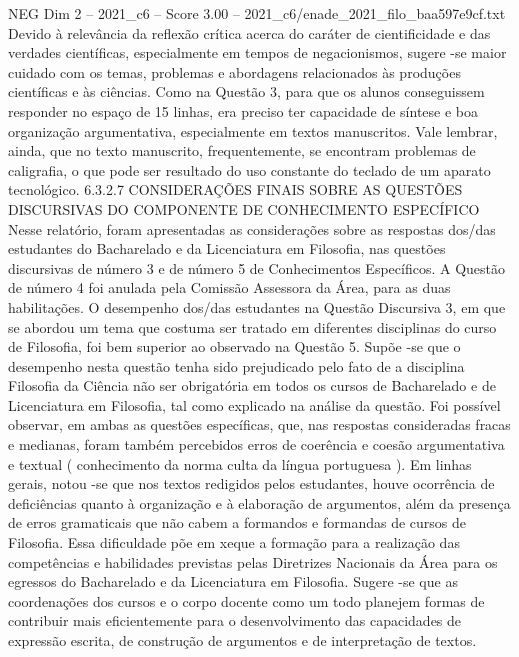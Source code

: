 \begin{textsample}{NEG Dim 2 – 2021\_c6 – Score 3.00 – 2021\_c6/enade\_2021\_filo\_baa597e9cf.txt}
Devido à relevância da reflexão crítica acerca do caráter de cientificidade e das verdades científicas, especialmente em tempos de negacionismos, sugere -se maior cuidado com os temas, problemas e abordagens relacionados às produções científicas e às ciências.
Como na Questão 3, para que os alunos conseguissem responder no espaço de 15 linhas, era preciso ter capacidade de síntese e boa organização argumentativa, especialmente em textos manuscritos.
Vale lembrar, ainda, que no texto manuscrito, frequentemente, se encontram problemas de caligrafia, o que pode ser resultado do uso constante do teclado de um aparato tecnológico. 6.3.2.7 CONSIDERAÇÕES FINAIS SOBRE AS QUESTÕES DISCURSIVAS DO COMPONENTE DE CONHECIMENTO ESPECÍFICO Nesse relatório, foram apresentadas as considerações sobre as respostas dos/das estudantes do Bacharelado e da Licenciatura em Filosofia, nas questões discursivas de número 3 e de número 5 de Conhecimentos Específicos.
A Questão de número 4 foi anulada pela Comissão Assessora da Área, para as duas habilitações.
O desempenho dos/das estudantes na Questão Discursiva 3, em que se abordou um tema que costuma ser tratado em diferentes disciplinas do curso de Filosofia, foi bem superior ao observado na Questão 5.
Supõe -se que o desempenho nesta questão tenha sido prejudicado pelo fato de a disciplina Filosofia da Ciência não ser obrigatória em todos os cursos de Bacharelado e de Licenciatura em Filosofia, tal como explicado na análise da questão.
Foi possível observar, em ambas as questões específicas, que, nas respostas consideradas fracas e medianas, foram também percebidos erros de coerência e coesão argumentativa e textual ( conhecimento da norma culta da língua portuguesa ).
Em linhas gerais, notou -se que nos textos redigidos pelos estudantes, houve ocorrência de deficiências quanto à organização e à elaboração de argumentos, além da presença de erros gramaticais que não cabem a formandos e formandas de cursos de Filosofia.
Essa dificuldade põe em xeque a formação para a realização das competências e habilidades previstas pelas Diretrizes Nacionais da Área para os egressos do Bacharelado e da Licenciatura em Filosofia.
Sugere -se que as coordenações dos cursos e o corpo docente como um todo planejem formas de contribuir mais eficientemente para o desenvolvimento das capacidades de expressão escrita, de construção de argumentos e de interpretação de textos.

\end{textsample}
